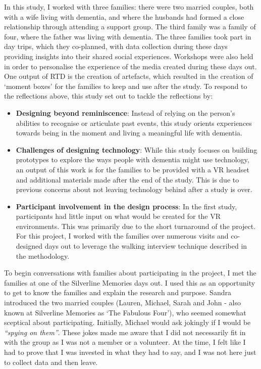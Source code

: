In this study, I worked with three families: there were two married couples, both with a wife living with dementia, and where the husbands had formed a close relationship through attending a support group. The third family was a family of four, where the father was living with dementia. The three families took part in day trips, which they co-planned, with data collection during these days providing insights into their shared social experiences. Workshops were also held  in order to personalise the experience of the media created during these days out. One output of RTD is the creation of artefacts, which resulted in the creation of `moment boxes' for the families to keep and use after the study. To respond to the reflections above, this study set out to tackle the reflections by:

\begin{itemize}
    \item \textbf{Designing beyond reminiscence}: Instead of relying on the person's abilities to recognise or articulate past events, this study orients experiences towards being in the moment and living a meaningful life with dementia.

    \item \textbf{Challenges of designing technology}: While this study focuses on building prototypes to explore the ways people with dementia might use technology, an output of this work is for the families to be provided with a VR headset and additional materials made after the end of the study. This is due to previous concerns about not leaving technology behind after a study is over.

    \item \textbf{Participant involvement in the design process}: In the first study, participants had little input on what would be created for the VR environments. This was primarily due to the short turnaround of the project. For this project, I worked with the families over numerous visits and co-designed days out to leverage the walking interview technique described in the methodology.
\end{itemize}

To begin conversations with families about participating in the project, I met the families at one of the Silverline Memories days out. I used this as an opportunity to get to know the families and explain the research and purpose. Sandra introduced the two married couples (Lauren, Michael, Sarah and John - also known at Silverline Memories as `The Fabulous Four'), who seemed somewhat sceptical about participating. Initially, Michael would ask jokingly if I would be \textit{``spying on them''}. These jokes made me aware that I did not necessarily fit in with the group as I was not a member or a volunteer. At the time, I felt like I had to prove that I was invested in what they had to say, and I was not here just to collect data and then leave. 

